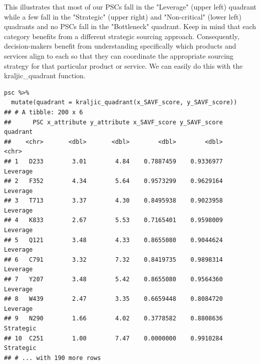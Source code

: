 \documentclass[twocolumn]{svjour3}       %
\begin{document}
This illustrates that most of our PSCs fall in the "Leverage" (upper left) quadrant while a few fall in the "Strategic" (upper right) and "Non-critical" (lower left) quadrants and no PSCs fall in the "Bottleneck" quadrant. Keep in mind that each category benefits from a different strategic sourcing approach. Consequently, decision-makers benefit from understanding specifically which products and services align to each so that they can coordinate the appropriate sourcing strategy for that particular product or service. We can easily do this with the kraljic\_quadrant function.
\begin{Verbatim}[fontsize=\footnotesize]
psc %>%
  mutate(quadrant = kraljic_quadrant(x_SAVF_score, y_SAVF_score))
## # A tibble: 200 x 6
##      PSC x_attribute y_attribute x_SAVF_score y_SAVF_score  quadrant
##    <chr>       <dbl>       <dbl>        <dbl>        <dbl>     <chr>
## 1   D233        3.01        4.84    0.7887459    0.9336977  Leverage
## 2   F352        4.34        5.64    0.9573299    0.9629164  Leverage
## 3   T713        3.37        4.30    0.8495938    0.9023958  Leverage
## 4   K833        2.67        5.53    0.7165401    0.9598009  Leverage
## 5   Q121        3.48        4.33    0.8655080    0.9044624  Leverage
## 6   C791        3.32        7.32    0.8419735    0.9898314  Leverage
## 7   Y207        3.48        5.42    0.8655080    0.9564360  Leverage
## 8   W439        2.47        3.35    0.6659448    0.8084720  Leverage
## 9   N290        1.66        4.02    0.3778582    0.8808636 Strategic
## 10  C251        1.00        7.47    0.0000000    0.9910284 Strategic
## # ... with 190 more rows
\end{Verbatim}
\end{document}
